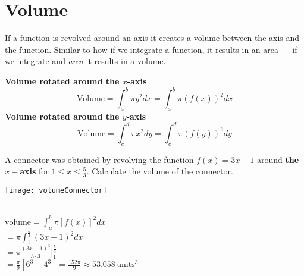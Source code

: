 \section{Volume}
If a function is revolved around an axis it creates a volume between the axis and the function. Similar to how if we integrate a function, it results in an area --- if we integrate and \textit{area} it results in a volume.

\begin{tcolorbox}
\textbf{Volume rotated around the $x$-axis}
\[ \text{Volume} = \int_{a}^{b} \pi y^2 dx = \int_{a}^{b} \pi (f(x))^2 dx\]
\textbf{Volume rotated around the $y$-axis}
\[ \text{Volume} = \int_{c}^{d} \pi x^2 dy =\int_{c}^{d} \pi (f(y))^2 dy  \]
\end{tcolorbox}

\example A connector was obtained by revolving the function $f(x)={3x+1}$ around \textbf{the $x-$axis} for $1\leq x \leq \frac{5}{3}$. Calculate the volume of the connector.
\begin{multicols}{2}
\begin{center}\texttt{[image: volumeConnector]}\end{center}
\columnbreak
\solution\\ $\mathrm{volume}=\int_{a}^{b}\pi[f(x)]^2 dx$\medskip\\
$=\pi\int_{1}^{\frac{5}{3}}\left(3x+1\right)^2 dx$\medskip\\
$=\pi \frac{ (3x+1)^3}{3\cdot 3} \Big|_{1}^\frac{5}{3}$\medskip\\
$=\frac{\pi}{9}\left[6^3-4^3\right]=\frac{152\pi}{9}\approx 53.058\, \mathrm{units}^3$
\end{multicols}

